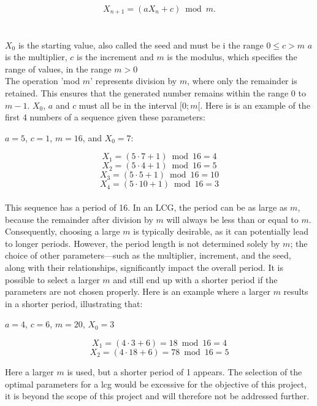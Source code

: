 $$X_{n+1} = (aX_n + c) \bmod m.$$  \\
\\
\noindent $X_0$ is the starting value, also called the seed and must be i the range $0\leq c>m$ \newline
$a$ is the multiplier,\newline 
$c$ is the increment and \newline
$m$ is the modulus, which specifies the range of values, in the range $m>0$ \newline
\\
\noindent The operation 'mod $m$' represents division by $m$, where only the remainder
is retained. This ensures that the generated number remains within the range
0 to $m-1$.  $X_0$, $a$ and $c$ must all be in the interval $[0; m[$. 
Here is is an example of the first 4 numbers of a sequence given these parameters: \newline

\begin{center}
	$a = 5$, $c = 1$, $m = 16$, and $X_0 = 7$:
\end{center}

$$X_1 = (5 \cdot 7 + 1)\bmod 16 = 4 $$
$$X_2 = (5 \cdot 4 + 1) \bmod 16 = 5 $$
$$X_3 = (5 \cdot 5 + 1) \bmod 16 = 10 $$
$$X_4 = (5 \cdot 10 + 1) \bmod 16 = 3 $$
\\
\noindent This sequence has a period of 16. In an LCG, the period can be as large as $m$,
because the remainder after division by $m$ will always be less than or equal to
$m$. Consequently, choosing a large $m$ is typically desirable, as it can potentially
lead to longer periods. However, the period length is not determined solely by
$m$; the choice of other parameters—such as the multiplier, increment, and the
seed, along with their relationships, significantly impact the overall period. It
is possible to select a larger $m$ and still end up with a shorter period if the parameters are not chosen properly. Here is an example where a larger $m$ results
in a shorter period, illustrating that:

\begin{center}
	$a=4$, $c=6$, $m=20$, $X_0=3$
\end{center}

$$X_1=(4 \cdot 3 +6)=18 \bmod 16=4$$ 
$$X_2=(4 \cdot 18+6)=78 \bmod 16=5$$

Here a larger $m$ is used, but a shorter period of 1 appears. 
\newline 
The selection of the optimal parameters for a lcg would be excessive for the objective of this project, it is beyond the scope of this project and will therefore not be addressed further.

